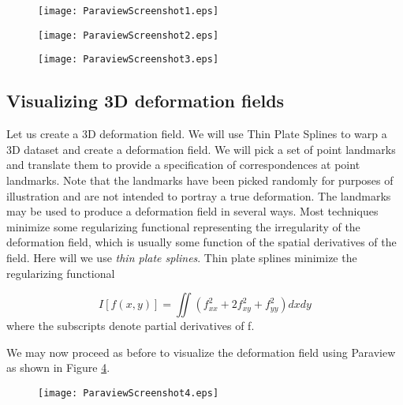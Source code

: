 \begin{figure}
\centering
\texttt{[image: ParaviewScreenshot1.eps]}
\label{fig:ParaviewScreenshot1}
\end{figure}

\begin{figure}
\centering
\texttt{[image: ParaviewScreenshot2.eps]}
\label{fig:ParaviewScreenshot2}
\end{figure}

\begin{figure}
\centering
\texttt{[image: ParaviewScreenshot3.eps]}
\label{fig:ParaviewScreenshot3}
\end{figure}



\subsection{Visualizing 3D deformation fields}
Let us create a 3D deformation field. We will use Thin Plate Splines to warp a 3D dataset and create a deformation field. We will pick a set of point landmarks and translate them to provide a specification of correspondences at point landmarks. Note that the landmarks have been picked randomly for purposes of illustration and are not intended to portray a true deformation. The landmarks may be used to produce a deformation field in several ways. Most techniques minimize some regularizing functional representing the irregularity of the deformation field, which is usually some function of the spatial derivatives of the field. Here will we use {\it thin plate splines}. Thin plate splines minimize the regularizing functional

\begin{equation}
I[f(x,y)] = \iint (f^2_{xx} + 2 f^2_{xy} + f^2_{yy}) dx dy
\end{equation}
where the subscripts denote partial derivatives of f.

We may now proceed as before to visualize the deformation field using Paraview as shown in Figure \ref{fig:ParaviewScreenshot4}.

\begin{figure}
\centering
\texttt{[image: ParaviewScreenshot4.eps]}
\label{fig:ParaviewScreenshot4}
\end{figure}
